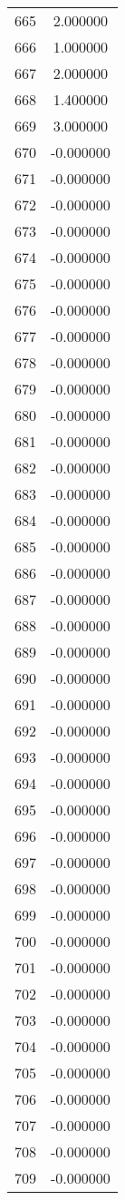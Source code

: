 \documentclass[12pt]{article}
\begin{document}
\begin{longtable}{@{}cc@{}}
665 & 2.000000 \\
666 & 1.000000 \\
667 & 2.000000 \\
668 & 1.400000 \\
669 & 3.000000 \\
670 & -0.000000 \\
671 & -0.000000 \\
672 & -0.000000 \\
673 & -0.000000 \\
674 & -0.000000 \\
675 & -0.000000 \\
676 & -0.000000 \\
677 & -0.000000 \\
678 & -0.000000 \\
679 & -0.000000 \\
680 & -0.000000 \\
681 & -0.000000 \\
682 & -0.000000 \\
683 & -0.000000 \\
684 & -0.000000 \\
685 & -0.000000 \\
686 & -0.000000 \\
687 & -0.000000 \\
688 & -0.000000 \\
689 & -0.000000 \\
690 & -0.000000 \\
691 & -0.000000 \\
692 & -0.000000 \\
693 & -0.000000 \\
694 & -0.000000 \\
695 & -0.000000 \\
696 & -0.000000 \\
697 & -0.000000 \\
698 & -0.000000 \\
699 & -0.000000 \\
700 & -0.000000 \\
701 & -0.000000 \\
702 & -0.000000 \\
703 & -0.000000 \\
704 & -0.000000 \\
705 & -0.000000 \\
706 & -0.000000 \\
707 & -0.000000 \\
708 & -0.000000 \\
709 & -0.000000 \\

\end{longtable}
\end{document}
